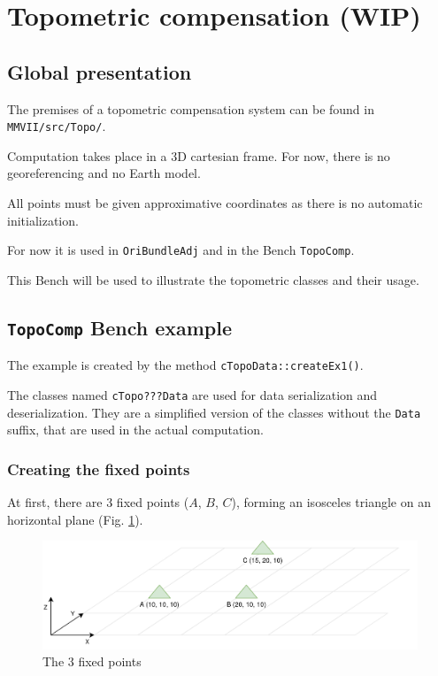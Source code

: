 
\section{Topometric compensation (WIP)}

\subsection{Global presentation}

The premises of a topometric compensation system can be found in \texttt{MMVII/src/Topo/}.

Computation takes place in a 3D cartesian frame. For now, there is no georeferencing
and no Earth model.

All points must be given approximative coordinates as there is no automatic initialization.

For now it is used in \texttt{OriBundleAdj} and in the Bench \texttt{TopoComp}.

This Bench will be used to illustrate the topometric classes and their usage.


\subsection{\texttt{TopoComp} Bench example}
\label{subsec:topoBench}

The example is created by the method \texttt{cTopoData::createEx1()}.

The classes named \texttt{cTopo???Data} are used for data serialization and deserialization.
They are a simplified version of the classes without the \texttt{Data} suffix, that are used in
the actual computation.


\subsubsection{Creating the fixed points}

At first, there are 3 fixed points ($A$, $B$, $C$), forming an isosceles triangle
on an horizontal plane (Fig. \ref{fig:topoEx1}).

\begin{figure}[!h]
\centering
\includegraphics[width=12cm]{Programmer/benchtopo1.png}
\caption{The 3 fixed points}
\label{fig:topoEx1}
\end{figure}

